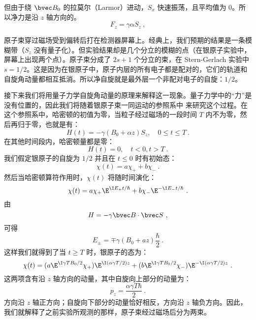 但由于绕 $\bvec B_0$ 的拉莫尔（Larmor）进动，$S_x$ 快速振荡，且平均值为 $0$。所以净力是沿 $z$ 轴方向的。
\begin{equation}
F_z=\gamma\alpha S_z~,
\end{equation}

原子束穿过磁场受到偏转后打在检测器屏幕上。经典上，我们预期的结果是一条模糊带（$S_z$ 没有量子化）。但实验结果却是几个分立的模糊的点（在银原子实验中，屏幕上出现两个点）。原子束分成了 $2s+1$ 个分立的束，在 Stern-Gerlach 实验中 $s=1/2$。这是因为在银原子中，原子内层的所有电子都是配对的，它们的轨道和自旋角动量都相互抵消。所以净自旋就是最外层一个非配对电子的自旋：$1/2$。

接下来我们将用量子力学自旋角动量的原理来解释这一现象。量子力学中的“力”是没有位置的，因此我们将随着银原子束一同运动的参照系中
来研究这个过程。在这个参照系中，哈密顿的初值为零，当粒子经过磁场的一段时间 $T$ 内不为零，然后再归于零，也就是有：
\begin{equation}
H(t)=-\gamma(B_0+\alpha z)S_z, \quad 0\leq t\leq T~.
\end{equation}
在其他时间段内，哈密顿量都是零：
\begin{equation}
H(t)=0, \quad t<0,t>T~.
\end{equation}
我们假定银原子的自旋为 $1/2$ 并且在 $t\leq 0$ 时有初始态：
\begin{equation}
\chi(t)=a\chi_++b\chi_-~.
\end{equation}
然后当哈密顿算符作用时，$\chi(t)$ 将随时间演化：
\begin{equation}
\chi(t)=a\chi_+\E^{\I E_+ t/\hbar} + b\chi_-\E^{-\I E_- t/\hbar}~.
\end{equation}
由
\begin{equation}
H=-\gamma\bvec B\cdot \bvec S~,
\end{equation}
可得
\begin{equation}
E_\pm = \mp \gamma(B_0+az)\frac{\hbar}{2}~.
\end{equation}
这样我们就得到了当 $t\geq T$ 时，银原子的态为：
\begin{equation}
\chi(t)=(a\E^{\I\gamma TB_0/2}\chi_+)\E^{\I(\alpha\gamma T/2)z} + (b\E^{\I\gamma TB_0/2}\chi_-)\E^{-\I(\alpha\gamma T/2)z} ~.
\end{equation}
这两项含有沿 $ z $ 轴方向的动量，其中自旋向上部分的动量为：
\begin{equation}
p_z=\frac{\alpha\gamma T\hbar}{2}~.
\end{equation}
方向沿 $ z $ 轴正方向；自旋向下部分的动量恰好相反，方向沿 $ z $ 轴负方向。因此，我们就解释了之前实验所观测的那样，原子束经过磁场后分为两束。

